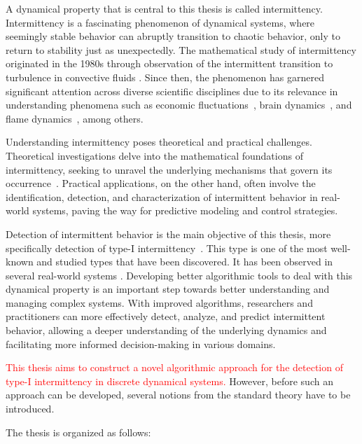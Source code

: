 A dynamical property that is central to this thesis is called intermittency.
Intermittency is a fascinating phenomenon of dynamical systems, where seemingly stable behavior can abruptly transition to chaotic behavior, only to return to stability just as unexpectedly.
The mathematical study of intermittency originated in the 1980s through observation of the intermittent transition to turbulence in convective fluids \cite{Pomeau1980}.
Since then, the phenomenon has garnered significant attention across diverse scientific disciplines due to its relevance in understanding phenomena such as economic fluctuations~\cite{Chian2007}, brain dynamics~\cite{Paradisi2013}, and flame dynamics~\cite{Pizza20110926}, among others.
\par
Understanding intermittency poses theoretical and practical challenges.
Theoretical investigations delve into the mathematical foundations of intermittency, seeking to unravel the underlying mechanisms that govern its occurrence~\cite{Elaskar2017, Elaskar2023}.
Practical applications, on the other hand, often involve the identification, detection, and characterization of intermittent behavior in real-world systems, paving the way for predictive modeling and control strategies.
\par
Detection of intermittent behavior is the main objective of this thesis, more specifically detection of type-I intermittency~\cite{Pomeau1980,Bussac1982,DelRio2014}.
This type is one of the most well-known and studied types that have been discovered.
It has been observed in several real-world systems \cite{Zebrowski2004,Parthimos2001,Dimitriu2008,Chiriac20070701}.
Developing better algorithmic tools to deal with this dynamical property is an important step towards better understanding and managing complex systems.
With improved algorithms, researchers and practitioners can more effectively detect, analyze, and predict intermittent behavior, allowing a deeper understanding of the underlying dynamics and facilitating more informed decision-making in various domains.

\bigskip

\textcolor{red}{This thesis aims to construct a novel algorithmic approach for the detection of type-I intermittency in discrete dynamical systems.}
However, before such an approach can be developed, several notions from the standard theory have to be introduced.
\par
The thesis is organized as follows:

